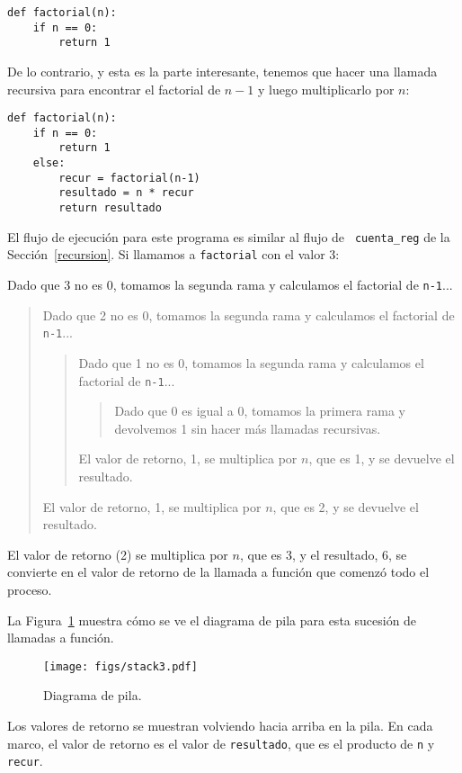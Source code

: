 \documentclass[10pt]{book}
\begin{document}
\begin{verbatim}
def factorial(n):
    if n == 0:
        return 1
\end{verbatim}
%
De lo contrario, y esta es la parte interesante, tenemos que hacer una
llamada recursiva para encontrar el factorial de $n-1$ y luego multiplicarlo por
$n$:

\begin{verbatim}
def factorial(n):
    if n == 0:
        return 1
    else:
        recur = factorial(n-1)
        resultado = n * recur
        return resultado
\end{verbatim}
%
El flujo de ejecución para este programa es similar al flujo de {\tt
cuenta\_reg} de la Sección~\ref{recursion}.  Si llamamos a {\tt factorial}
con el valor 3:

Dado que 3 no es 0, tomamos la segunda rama y calculamos el factorial
de {\tt n-1}...

\begin{quote}
Dado que 2 no es 0, tomamos la segunda rama y calculamos el factorial de
{\tt n-1}...


  \begin{quote}
  Dado que 1 no es 0, tomamos la segunda rama y calculamos el factorial
  de {\tt n-1}...


    \begin{quote}
    Dado que 0 es igual a 0, tomamos la primera rama y devolvemos 1
    sin hacer más llamadas recursivas.
    \end{quote}


  El valor de retorno, 1, se multiplica por $n$, que es 1, y se
  devuelve el resultado.
  \end{quote}


El valor de retorno, 1, se multiplica por $n$, que es 2, y se
devuelve el resultado.
\end{quote}


El valor de retorno (2) se multiplica por $n$, que es 3, y el resultado, 6,
se convierte en el valor de retorno de la llamada a función que comenzó todo
el proceso.

La Figura~\ref{fig.stack3} muestra cómo se ve el diagrama de pila
para esta sucesión de llamadas a función.

\begin{figure}
\centerline
{\texttt{[image: figs/stack3.pdf]}}
\caption{Diagrama de pila.}
\label{fig.stack3}
\end{figure}

Los valores de retorno se muestran volviendo hacia arriba en la pila.  En cada
marco, el valor de retorno es el valor de {\tt resultado}, que es el
producto de {\tt n} y {\tt recur}.
\end{document}

